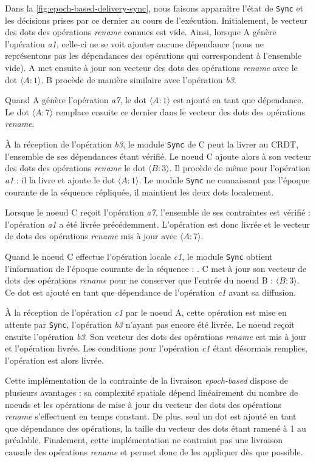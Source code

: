 Dans la \autoref{fig:epoch-based-delivery-sync}, nous faisons apparaître l'état de \texttt{Sync} et les décisions prises par ce dernier au cours de l'exécution.
Initialement, le vecteur des dots des opérations \emph{rename} connues est vide.
Ainsi, lorsque A génère l'opération \emph{a1}, celle-ci ne se voit ajouter aucune dépendance (nous ne représentons pas les dépendances des opérations qui correspondent à l'ensemble vide).
A met ensuite à jour son vecteur des dots des opérations \emph{rename} avec le dot $\langle A:1 \rangle$.
B procède de manière similaire avec l'opération \emph{b3}.

Quand A génère l'opération \emph{a7}, le dot $\langle A:1 \rangle$ est ajouté en tant que dépendance.
Le dot $\langle A:7 \rangle$ remplace ensuite ce dernier dans le vecteur des dots des opérations \emph{rename}.

À la réception de l'opération \emph{b3}, le module \texttt{Sync} de C peut la livrer au \ac{CRDT}, l'ensemble de ses dépendances étant vérifié.
Le noeud C ajoute alors à son vecteur des dots des opérations \emph{rename} le dot $\langle B:3 \rangle$.
Il procède de même pour l'opération \emph{a1} : il la livre et ajoute le dot $\langle A:1 \rangle$.
Le module \texttt{Sync} ne connaissant pas l'époque courante de la séquence répliquée, il maintient les deux dots localement.

Lorsque le noeud C reçoit l'opération \emph{a7}, l'ensemble de ses contraintes est vérifié : l'opération \emph{a1} a été livrée précédemment.
L'opération est donc livrée et le vecteur de dots des opérations \emph{rename} mis à jour avec $\langle A:7 \rangle$.

Quand le noeud C effectue l'opération locale \emph{c1}, le module \texttt{Sync} obtient l'information de l'époque courante de la séquence : .
C met à jour son vecteur de dots des opérations \emph{rename} pour ne conserver que l'entrée du noeud B : $\langle B:3 \rangle$.
Ce dot est ajouté en tant que dépendance de l'opération \emph{c1} avant sa diffusion.

À la réception de l'opération \emph{c1} par le noeud A, cette opération est mise en attente par \texttt{Sync}, l'opération \emph{b3} n'ayant pas encore été livrée.
Le noeud reçoit ensuite l'opération \emph{b3}.
Son vecteur des dots des opérations \emph{rename} est mis à jour et l'opération livrée.
Les conditions pour l'opération \emph{c1} étant désormais remplies, l'opération est alors livrée.

Cette implémentation de la contrainte de la livraison \emph{epoch-based} dispose de plusieurs avantages : sa complexité spatiale dépend linéairement du nombre de noeuds et les opérations de mise à jour du vecteur des dots des opérations \emph{rename} s'effectuent en temps constant.
De plus, seul un dot est ajouté en tant que dépendance des opérations, la taille du vecteur des dots étant ramené à 1 au préalable.
Finalement, cette implémentation ne contraint pas une livraison causale des opérations \emph{rename} et permet donc de les appliquer dès que possible.

